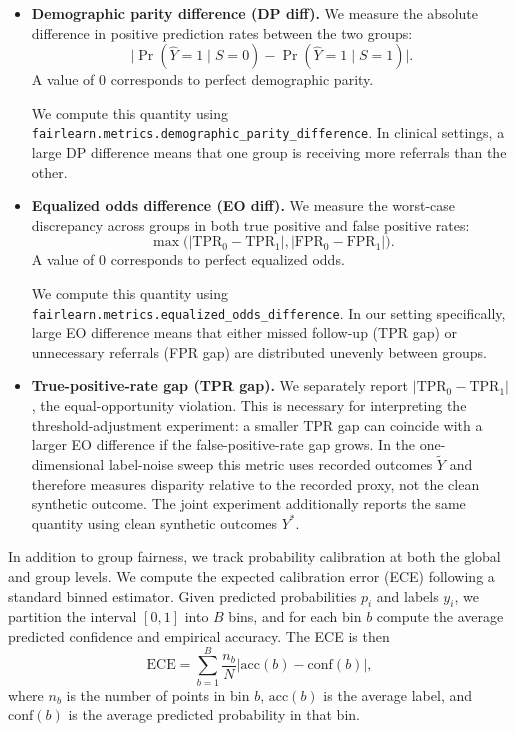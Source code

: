 \documentclass[11pt, letterpaper]{article}
\begin{document}
\begin{itemize}
    \item \textbf{Demographic parity difference (DP diff).} We measure the absolute difference in positive prediction rates between the two groups:
    \[
        \lvert \Pr(\hat{Y}=1 \mid S=0) - \Pr(\hat{Y}=1 \mid S=1) \rvert.
    \]
    A value of 0 corresponds to perfect demographic parity.


    We compute this quantity using \texttt{fairlearn.metrics.demographic\_parity\_difference}. In clinical settings, a large DP difference means that one group is receiving more referrals than the other.

    \item \textbf{Equalized odds difference (EO diff).} We measure the worst-case discrepancy across groups in both true positive and false positive rates:
    \[
        \max\big(
        \lvert \mathrm{TPR}_0 - \mathrm{TPR}_1 \rvert,
        \lvert \mathrm{FPR}_0 - \mathrm{FPR}_1 \rvert
        \big).
    \]
    A value of 0 corresponds to perfect equalized odds. 
    
    We compute this quantity using \texttt{fairlearn.metrics.equalized\_odds\_difference}. In our setting specifically, large EO difference means that either missed follow-up (TPR gap) or unnecessary referrals (FPR gap) are distributed unevenly between groups.

    \item \textbf{True-positive-rate gap (TPR gap).} We separately report \(\lvert \mathrm{TPR}_0-\mathrm{TPR}_1\rvert\), the equal-opportunity violation. This is necessary for interpreting the threshold-adjustment experiment: a smaller TPR gap can coincide with a larger EO difference if the false-positive-rate gap grows. In the one-dimensional label-noise sweep this metric uses recorded outcomes $\tilde{Y}$ and therefore measures disparity relative to the recorded proxy, not the clean synthetic outcome. The joint experiment additionally reports the same quantity using clean synthetic outcomes $Y^*$.
\end{itemize}

In addition to group fairness, we track probability calibration at both the global and group levels. We compute the expected calibration error (ECE) following a standard binned estimator. Given predicted probabilities \(p_i\) and labels \(y_i\), we partition the interval \([0,1]\) into \(B\) bins, and for each bin \(b\) compute the average predicted confidence and empirical accuracy. The ECE is then
\[
    \mathrm{ECE}
    = \sum_{b=1}^B \frac{n_b}{N}
    \big\lvert \mathrm{acc}(b) - \mathrm{conf}(b) \big\rvert,
\]
where \(n_b\) is the number of points in bin \(b\), \(\mathrm{acc}(b)\) is the average label, and \(\mathrm{conf}(b)\) is the average predicted probability in that bin.
\end{document}
